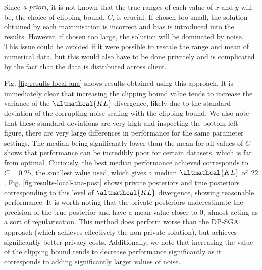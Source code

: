 Since $\emph{a priori}$, it is not known that the true ranges of each value of $x$ and $y$ will be, the choice of clipping bound, $C$, is crucial. If chosen too small, the solution obtained by each maximisation is incorrect and bias is introduced into the results. However, if chosen too large, the solution will be dominated by noise. This issue could be avoided if it were possible to rescale the range and mean of numerical data, but this would also have to be done privately and is complicated by the fact that the data is distributed across client. 

Fig. \ref{fig:results-local-ana} shows results obtained using this approach. It is immediately clear that increasing the clipping bound value tends to increase the variance of the $\altmathcal{KL}$ divergence, likely due to the standard deviation of the corrupting noise scaling with the clipping bound. We also note that these standard deviations are very high and inspecting the bottom left figure, there are very large differences in performance for the same parameter settings. The median being significantly lower than the mean for all values of $C$ shows that performance can be incredibly poor for certain datasets, which is far from optimal. Curiously, the best median performance achieved corresponds to $C=0.25$, the smallest value used, which gives a median $\altmathcal{KL}$ of $~22$. Fig. \ref{fig:results-local-ana-post} shows private posteriors and true posteriors corresponding to this level of $\altmathcal{KL}$ divergence, showing reasonable performance. It is worth noting that the private posteriors underestimate the precision of the true posterior and have a mean value closer to $0$, almost acting as a sort of regularisation. This method does perform worse than the DP-SGA approach (which achieves effectively the non-private solution), but achieves significantly better privacy costs. Additionally, we note that increasing the value of the clipping bound tends to decrease performance significantly as it corresponds to adding significantly larger values of noise. 

